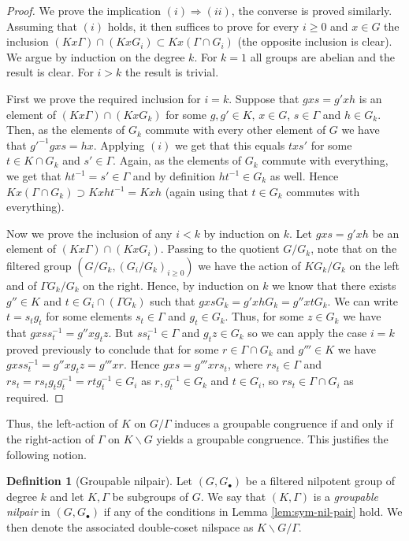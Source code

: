 \documentclass[a4paper,12pt,reqno]{amsart}
\theoremstyle{definition}
\newtheorem{defn}[theorem]{Definition}
\begin{document}
\begin{proof}
We prove the implication $(i)\Rightarrow (ii)$, the converse is proved similarly. Assuming that $(i)$ holds, it then suffices to prove for every $i\ge 0$ and $x\in G$ the inclusion $(Kx{\Gamma})\cap(KxG_i)\subset Kx({\Gamma}\cap G_i)$ (the opposite inclusion is clear). We argue by induction on the degree $k$. For $k=1$ all groups are abelian and the result is clear. For $i>k$ the result is trivial.

First we prove the required inclusion for $i=k$. Suppose that $gxs = g'xh$ is an element of $(Kx{\Gamma})\cap (KxG_k)$ for some $g,g'\in K$, $x\in G$, $s\in {\Gamma}$ and $h\in G_k$. Then, as the elements of $G_k$ commute with every other element of $G$ we have that $g'^{-1}gxs=hx$. Applying $(i)$ we get that this equals $txs'$ for some $t\in K\cap G_k$ and $s'\in {\Gamma}$. Again, as the elements of $G_k$ commute with everything, we get that $ht^{-1}=s'\in {\Gamma}$ and by definition  $ht^{-1}\in G_k$ as well. Hence $Kx({\Gamma}\cap G_k)\supset Kxht^{-1} = Kxh$ (again using that $t\in G_k$ commutes with everything).

Now we prove the inclusion of any $i<k$ by induction on $k$. Let $gxs = g'xh$ be an element of $(Kx{\Gamma})\cap (KxG_i)$. Passing to the quotient $G/G_k$, note that on the filtered group $(G/G_k,(G_i/G_k)_{i\ge 0})$ we have the action of  $KG_k/G_k$ on the left and of ${\Gamma}G_k/G_k$ on the right. Hence, by induction on $k$ we know that there exists $g''\in K$ and $t\in G_i\cap ({\Gamma}G_k)$ such that $gxsG_k = g'xhG_k=g''xtG_k$. We can write $t=s_tg_t$ for some elements $s_t\in {\Gamma}$ and $g_t\in G_k$. Thus, for some $z\in G_k$ we have that $gxss_t^{-1} =g'' xg_tz$. But $ss_t^{-1}\in {\Gamma}$ and $g_tz\in G_k$ so we can apply the case $i=k$ proved previously to conclude that for some $r\in {\Gamma}\cap G_k$ and $g'''\in K$ we have $gxss_t^{-1} =g'' xg_tz= g'''xr$. Hence $gxs = g''' x rs_t$, where $rs_t\in \Gamma$ and $rs_t = r s_tg_tg_t^{-1} = r  tg_t^{-1}\in G_i$ as $r,g_t^{-1}\in G_k$ and $t\in G_i$, so $rs_t\in \Gamma\cap G_i$ as required.
\end{proof}
\noindent Thus, the left-action of $K$ on $G/{\Gamma}$ induces a groupable congruence if and only if the right-action of ${\Gamma}$ on $K\backslash G$ yields a groupable congruence. This justifies the following notion.
\begin{defn}[Groupable nilpair]
Let $(G,G_\bullet)$ be a filtered nilpotent group of degree $k$ and let $K,\Gamma$ be  subgroups of $G$. We say that $(K,\Gamma)$ is a \emph{groupable nilpair} in $(G,G_\bullet)$ if any of the conditions in Lemma \ref{lem:sym-nil-pair} hold. We then denote the associated double-coset nilspace as $K\backslash G/\Gamma$.
\end{defn}
\end{document}
